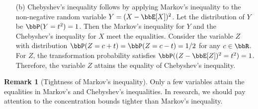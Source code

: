 \documentclass[11pt]{article}
\theoremstyle{plain}
\theoremstyle{definition}
\newtheorem{rmk}{Remark}
\begin{document}
\begin{enumerate}
	 Consider a variable $X$ with distribution $P(X = t) = 1$. The variable $X$ satisfies 
	 \[ \int_{0}^t x f_X(x) dx = 0 \text{ and } \int_{t}^{+\infty} x f_X(x) dx =\int_{t}^{+\infty} t f_X(x) dx. \]
	 Therefore, for given $t$, the variable $X$ attains the equality of Markov's inequality.
	 
	 \item[(b)] Chebyshev's inequality follows by applying Markov's inequality to the non-negative random variable $Y = {(X - \bbE[X])^2}$. Let the distribution of $Y$ be $\bbP(Y = t^2) = 1$. Then the Markov's inequality for $Y$ and the Chebyshev's inequality for $X$ meet the equalities. Consider the variable $Z$ with distribution $\bbP(Z = c+t) = \bbP(Z = c-t)  = 1/2 $ for any $ c \in \bbR$. For $Z$, the transformation probability satisfies $\bbP((Z - \bbE[Z])^2= t^2) = 1$. Therefore, the variable $Z$ attains the equality of Chebyshev's inequality.
	 
\fi
	 
	 
\end{enumerate}

\begin{rmk}[Tightness of Markov's inequality]
	Only a few variables attain the equalities in Markov's and Chebyshev's inequalities. In research, we should pay attention to the concentration bounds tighter than Markov's inequality.
\end{rmk}
\end{document}
